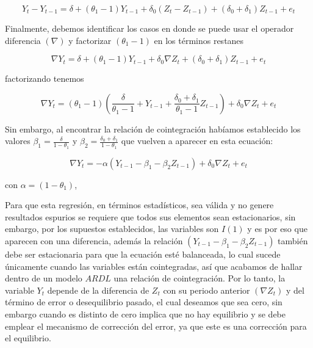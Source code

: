 \begin{equation}
Y_t - Y_{t-1}=\delta + (\theta_1 -1) Y_{t-1} + \delta_0( Z_t- Z_{t-1}) + (\delta_0 + \delta_1) Z_{t-1}  + e_t 
\end{equation}
 
 Finalmente, debemos identificar los casos en donde se puede usar el operador diferencia $(\nabla)$ y factorizar $(\theta_1 -1)$ en los términos restanes
 
 \begin{equation}
\nabla Y_t =\delta + (\theta_1 -1) Y_{t-1} + \delta_0 \nabla Z_t + (\delta_0 + \delta_1) Z_{t-1}  + e_t 
\end{equation}

factorizando tenemos 

 \begin{equation}
\nabla Y_t = (\theta_1 -1)\left ( \frac{\delta}{\theta_1 -1} +  Y_{t-1} +  \frac{\delta_0 + \delta_1}{\theta_1 -1} Z_{t-1} \right ) + \delta_0 \nabla Z_t  + e_t 
\end{equation}
 
Sin embargo, al encontrar la relación de cointegración habíamos establecido los valores  $\beta_1=\frac{\delta}{1-\theta_1}$ y $\beta_2=\frac{\delta_0 + \delta_1}{1-\theta_1}$  que vuelven a aparecer en esta ecuación:

 \begin{equation}\label{eq:rcoint}
\nabla Y_t = -\alpha \left (   Y_{t-1} - \beta_1  -\beta_2 Z_{t-1} \right ) + \delta_0 \nabla Z_t  + e_t   
\end{equation}
 
 con $\alpha=(1-\theta_1)$,\bigskip
 
 Para que esta regresión, en términos estadísticos, sea válida y no genere resultados espurios se requiere que todos sus elementos sean estacionarios, sin embargo, por los supuestos establecidos, las variables son $I(1)$ y es por eso que aparecen con una diferencia, además la relación  $\left (   Y_{t-1} - \beta_1  -\beta_2 Z_{t-1} \right )$ también debe ser estacionaria para que la ecuación esté balanceada, lo cual sucede únicamente cuando las variables están cointegradas, así que acabamos de hallar dentro de un modelo $ARDL$ una relación de cointegración. Por lo tanto, la variable $Y_t$ depende de la diferencia de $Z_t$ con su periodo anterior $(\nabla Z_t )$ y del término de error o desequilibrio pasado, el cual deseamos que sea cero, sin embargo cuando es distinto de cero implica que no hay equilibrio y se debe emplear el mecanismo de corrección del error, ya que este es una corrección para el equilibrio.  \bigskip
 
